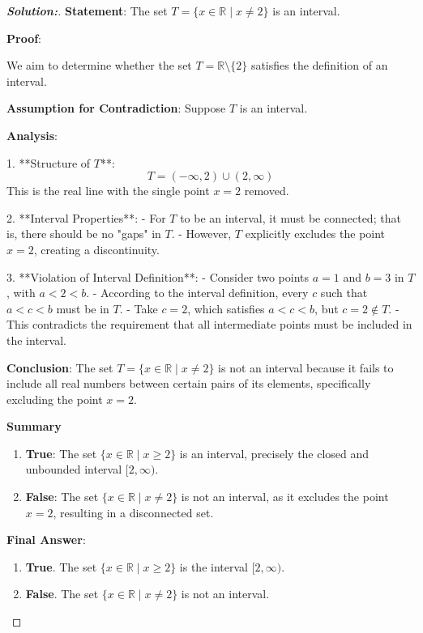 \documentclass[12pt]{article}
\theoremstyle{definition}\newtheorem{problem}{Problem}
\newenvironment{solution}{\begin{proof}[\bfseries\textup{Solution:}]}{\end{proof}}
\begin{document}
\begin{solution}
    \textbf{Statement}: The set \( T = \{ x \in \mathbb{R} \mid x \neq 2 \} \) is an interval.
    
    \textbf{Proof}:
    
    We aim to determine whether the set \( T = \mathbb{R} \setminus \{2\} \) satisfies the definition of an interval.
    
    \textbf{Assumption for Contradiction}: Suppose \( T \) is an interval.
    
    \textbf{Analysis}:
    
    1. **Structure of \( T \)**:
        \[
        T = (-\infty, 2) \cup (2, \infty)
        \]
        This is the real line with the single point \( x = 2 \) removed.
    
    2. **Interval Properties**:
        - For \( T \) to be an interval, it must be connected; that is, there should be no "gaps" in \( T \).
        - However, \( T \) explicitly excludes the point \( x = 2 \), creating a discontinuity.
    
    3. **Violation of Interval Definition**:
        - Consider two points \( a = 1 \) and \( b = 3 \) in \( T \), with \( a < 2 < b \).
        - According to the interval definition, every \( c \) such that \( a < c < b \) must be in \( T \).
        - Take \( c = 2 \), which satisfies \( a < c < b \), but \( c = 2 \notin T \).
        - This contradicts the requirement that all intermediate points must be included in the interval.
    
    \textbf{Conclusion}: The set \( T = \{ x \in \mathbb{R} \mid x \neq 2 \} \) is not an interval because it fails to include all real numbers between certain pairs of its elements, specifically excluding the point \( x = 2 \).
    
    \textbf{Summary}
    
    \begin{enumerate}
        \item \textbf{True}: The set \( \{ x \in \mathbb{R} \mid x \geq 2 \} \) is an interval, precisely the closed and unbounded interval \( [2, \infty) \).
        \item \textbf{False}: The set \( \{ x \in \mathbb{R} \mid x \neq 2 \} \) is not an interval, as it excludes the point \( x = 2 \), resulting in a disconnected set.
    \end{enumerate}
    
    \textbf{Final Answer}:
    
    \begin{enumerate}
        \item \textbf{True}. The set \( \{ x \in \mathbb{R} \mid x \geq 2 \} \) is the interval \( [2, \infty) \).
        \item \textbf{False}. The set \( \{ x \in \mathbb{R} \mid x \neq 2 \} \) is not an interval.
    \end{enumerate}
    

\end{solution}
\end{document}
